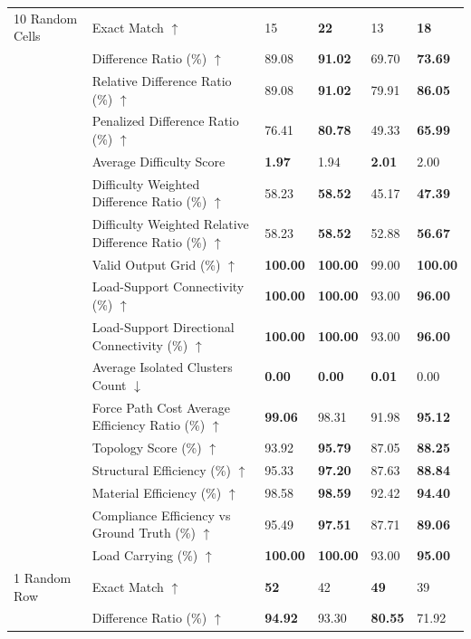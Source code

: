 \begin{table}[!h]
{\begin{tabular}{llll|ll}
\midrule
10 Random Cells & Exact Match $\uparrow$ & 15 & \textbf{22} & 13 & \textbf{18} \\
 & Difference Ratio (\%) $\uparrow$ & 89.08 & \textbf{91.02} & 69.70 & \textbf{73.69} \\
 & Relative Difference Ratio (\%) $\uparrow$ & 89.08 & \textbf{91.02} & 79.91 & \textbf{86.05} \\
 & Penalized Difference Ratio (\%) $\uparrow$ & 76.41 & \textbf{80.78} & 49.33 & \textbf{65.99} \\
 & Average Difficulty Score & \textbf{1.97} & 1.94 & \textbf{2.01} & 2.00 \\
 & Difficulty Weighted Difference Ratio (\%) $\uparrow$ & 58.23 & \textbf{58.52} & 45.17 & \textbf{47.39} \\
 & Difficulty Weighted Relative Difference Ratio (\%) $\uparrow$ & 58.23 & \textbf{58.52} & 52.88 & \textbf{56.67} \\
 & Valid Output Grid (\%) $\uparrow$ & \textbf{100.00} & \textbf{100.00} & 99.00 & \textbf{100.00} \\
 & Load-Support Connectivity (\%) $\uparrow$ & \textbf{100.00} & \textbf{100.00} & 93.00 & \textbf{96.00} \\
 & Load-Support Directional Connectivity (\%) $\uparrow$ & \textbf{100.00} & \textbf{100.00} & 93.00 & \textbf{96.00} \\
 & Average Isolated Clusters Count $\downarrow$ & \textbf{0.00} & \textbf{0.00} & \textbf{0.01} & 0.00 \\
 & Force Path Cost Average Efficiency Ratio (\%) $\uparrow$ & \textbf{99.06} & 98.31 & 91.98 & \textbf{95.12} \\
 & Topology Score (\%) $\uparrow$ & 93.92 & \textbf{95.79} & 87.05 & \textbf{88.25} \\
 & Structural Efficiency (\%) $\uparrow$ & 95.33 & \textbf{97.20} & 87.63 & \textbf{88.84} \\
 & Material Efficiency (\%) $\uparrow$ & 98.58 & \textbf{98.59} & 92.42 & \textbf{94.40} \\
 & Compliance Efficiency vs Ground Truth (\%) $\uparrow$ & 95.49 & \textbf{97.51} & 87.71 & \textbf{89.06} \\
 & Load Carrying (\%) $\uparrow$ & \textbf{100.00} & \textbf{100.00} & 93.00 & \textbf{95.00} \\
\midrule
1 Random Row & Exact Match $\uparrow$ & \textbf{52} & 42 & \textbf{49} & 39 \\
 & Difference Ratio (\%) $\uparrow$ & \textbf{94.92} & 93.30 & \textbf{80.55} & 71.92 \\

\end{tabular}}
\end{table}
